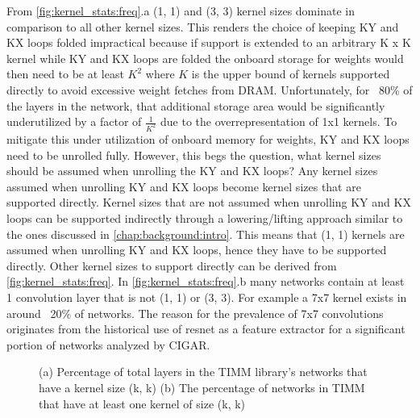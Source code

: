 From \autoref{fig:kernel_stats:freq}.a (1, 1) and (3, 3) kernel sizes dominate in
comparison to all other kernel sizes. This renders the choice of keeping KY and
KX loops folded impractical because if support is extended to an arbitrary K x K
kernel while KY and KX loops are folded the onboard storage for weights would
then need to be at least $K^2$ where $K$ is the upper bound of kernels supported
directly to avoid excessive weight fetches from DRAM. Unfortunately, for ~80\% of
the layers in the network, that additional storage area would be significantly
underutilized by a factor of $\frac{1}{K^2}$ due to the overrepresentation of
1x1 kernels. To mitigate this under utilization of onboard memory for weights, KY
and KX loops need to be unrolled fully. However, this begs the question, what
kernel sizes should be assumed when unrolling the KY and KX loops? Any kernel
sizes assumed when unrolling KY and KX loops become kernel sizes that are
supported directly. Kernel sizes that are not assumed when unrolling KY and KX
loops can be supported indirectly through a lowering/lifting approach similar
to the ones discussed in \autoref{chap:background:intro}. This means that (1, 1)
kernels are assumed when unrolling KY and KX loops, hence they have to be
supported directly. Other kernel sizes to support directly can be derived from
\autoref{fig:kernel_stats:freq}. In \autoref{fig:kernel_stats:freq}.b many
networks contain at least 1 convolution layer that is not (1, 1) or (3, 3). For
example a 7x7 kernel exists in around ~20\% of networks. The reason for the
prevalence of 7x7 convolutions originates from the historical use of resnet
\cite{resnet} as a feature extractor for a significant portion of networks
analyzed by CIGAR.

\clearpage
\begin{figure}
    \centering
    \caption{(a) Percentage of total layers in the TIMM library's networks that have a kernel size (k, k) (b) The percentage of networks in TIMM that have at least one kernel of size (k, k)}
    \label{fig:kernel_stats:freq}
\end{figure}


